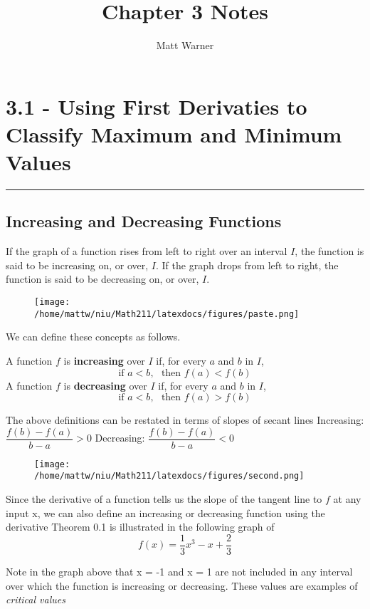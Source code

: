\documentclass{report}
\title{\Huge{Chapter 3 Notes}}
\author{\huge{Matt Warner}}
\date{\huge{}}
\begin{document}
  \maketitle
  \section*{3.1 - Using First Derivaties to Classify Maximum and Minimum Values}
  \bigbreak \noindent \bigbreak \noindent
  \hrule
  \bigbreak \noindent
  \vspace{-3mm}\subsection*{Increasing and Decreasing Functions}
  \bigbreak \noindent
  If the graph of a function rises from left to right over an interval $I$, the function is said to be increasing on, or over, $I$.
  \bigbreak \noindent
  If the graph drops from left to right, the function is said to be decreasing on, or over, $I$.
  \begin{figure}[ht]
  \centering
  \texttt{[image:   /home/mattw/niu/Math211/latexdocs/figures/paste.png]}
  \end{figure}
\bigbreak \noindent
We can define these concepts as follows.
\begin{mdframed}
  \vspace{2mm}

  A function $f$ is \textbf{increasing} over $I$ if, for every $a$ and $b$ in $I$, 
  $$ \text{if } a < b, \ \ \ \text{then } f(a) < f(b)$$
  A function $f$ is \textbf{decreasing} over $I$ if, for every $a$ and $b$ in $I$,
  $$ \text{if } a < b, \ \ \ \text{then } f(a) > f(b)$$
\end{mdframed}
\bigbreak \noindent
The above definitions can be restated in terms of slopes of secant lines
\bigbreak \noindent
\hspace{35mm}Increasing: $\dfrac{f(b) - f(a)}{b - a} > 0$ \hspace{20mm} Decreasing: $\dfrac{f(b) -f(a)}{b - a} < 0$
\begin{figure}[ht]
\centering
\texttt{[image:  /home/mattw/niu/Math211/latexdocs/figures/second.png]}
\end{figure}
\bigbreak \noindent
Since the derivative of a function tells us the slope of the tangent line to $f$ at any input x, we can also define an increasing or decreasing function using the derivative
\pagebreak
{}
\bigbreak \noindent
Theorem 0.1 is illustrated in the following graph of
$$ f(x) = \dfrac{1}{3}x^{3} - x + \dfrac{2}{3}$$
\begin{figure}[ht]
    \centering
\end{figure}
\bigbreak \noindent
Note in the graph above that x = -1 and x = 1 are not included in any interval over which the function is increasing or decreasing. These values are examples of \textit{critical values}
\bigbreak \noindent
\end{document}
